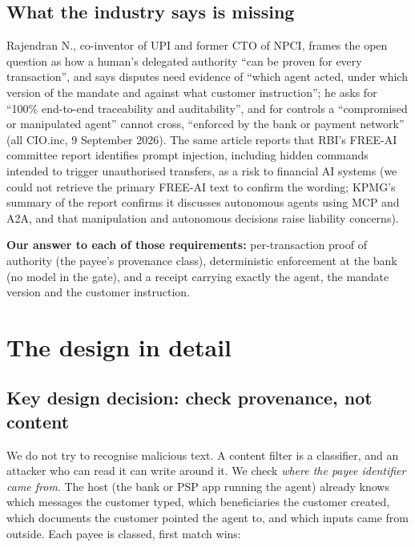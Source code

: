 \documentclass[10pt,a4paper]{article}
\begin{document}
\subsection{What the industry says is missing}
Rajendran N., co-inventor of UPI and former CTO of NPCI, frames the open question as how a human's delegated authority
``can be proven for every transaction'', and says disputes need evidence of ``which agent acted, under which version of the
mandate and against what customer instruction''; he asks for ``100\% end-to-end traceability and auditability'', and for
controls a ``compromised or manipulated agent'' cannot cross, ``enforced by the bank or payment network'' (all CIO.inc,
9 September 2026). The same article reports that RBI's FREE-AI committee report identifies prompt injection, including
hidden commands intended to trigger unauthorised transfers, as a risk to financial AI systems (we could not retrieve the
primary FREE-AI text to confirm the wording; KPMG's summary of the report confirms it discusses autonomous agents using MCP
and A2A, and that manipulation and autonomous decisions raise liability concerns).

\textbf{Our answer to each of those requirements:} per-transaction proof of authority (the payee's provenance class),
deterministic enforcement at the bank (no model in the gate), and a receipt carrying exactly the agent, the mandate version
and the customer instruction.

\section{The design in detail}\label{sec:approach}

\subsection{Key design decision: check provenance, not content}
We do not try to recognise malicious text. A content filter is a classifier, and an attacker who can read it can write around
it. We check \emph{where the payee identifier came from}. The host (the bank or PSP app running the agent) already knows which
messages the customer typed, which beneficiaries the customer created, which documents the customer pointed the agent to,
and which inputs came from outside. Each payee is classed, first match wins:
\end{document}
